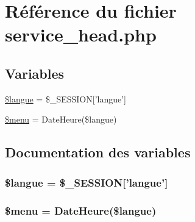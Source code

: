 \hypertarget{service__head_8php}{
\section{R\'{e}f\'{e}rence du fichier service\_\-head.php}
\label{service__head_8php}
}
\subsection*{Variables}
\begin{CompactItemize}
\item 
\hyperlink{service__head_8php_a0}{\$langue} = \$\_\-SESSION\mbox{[}'langue'\mbox{]}
\item 
\hyperlink{service__head_8php_a1}{\$menu} = Date\-Heure(\$langue)
\end{CompactItemize}


\subsection{Documentation des variables}
\hypertarget{service__head_8php_a0}{
\subsubsection[\$langue]{\setlength{\rightskip}{0pt plus 5cm}\$langue = \$\_\-SESSION\mbox{[}'langue'\mbox{]}}}
\label{service__head_8php_a0}


\hypertarget{service__head_8php_a1}{
\subsubsection[\$menu]{\setlength{\rightskip}{0pt plus 5cm}\$menu = Date\-Heure(\$langue)}}
\label{service__head_8php_a1}


